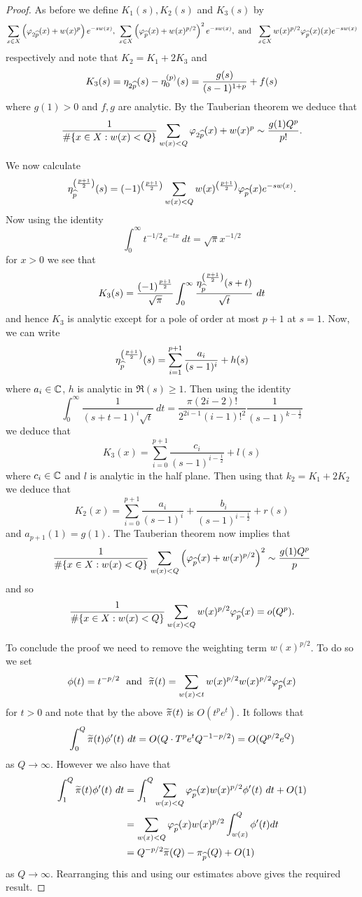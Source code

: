 \documentclass[12pt,a4paper,reqno]{amsart}
\begin{document}
\begin{proof}
As before we define $K_1(s), K_2(s)$ and $K_3(s)$ by 
\begin{align*}
 \sum_{x \in X} \left(\varphi_{2\widehat{p}}(x) + w(x)^p\right) e^{-sw(x)}, \
 \sum_{x \in X} \left(\varphi_{\widehat{p}}(x)+ w(x)^{p/2}\right)^2 e^{-sw(x)}, \text{ and } \
 \sum_{x \in X} w(x)^{p/2} \varphi_{\widehat{p}}(x)(x) e^{-sw(x)}
\end{align*}
respectively
and note that $K_2 = K_1 + 2K_3$ and 
\[
K_3(s) = \eta_{2\widehat{p}}(s) - \eta_0^{(p)}(s) = \frac{g(s)}{(s-1)^{1+p}} + f(s)
\]
where $g(1) > 0$ and $f,g$ are analytic.
By the Tauberian theorem we deduce that
\[
\frac{1}{\#\{x\in X: w(x) < Q\}} \sum_{w(x)<Q} \varphi_{2\widehat{p}}(x)+ w(x)^p \sim \frac{g(1) Q^p}{p!}.
\]

We now calculate
\[
\eta_{\widehat{p}}^{\left( \frac{p+1}{2}\right)}(s) = (-1)^{\left(\frac{p+1}{2}\right)} \sum_{w(x) < Q} w(x)^{\left( \frac{p+1}{2}\right)} \varphi_{\widehat{p}}(x) e^{-sw(x)}.
\]
Now using the identity
\[
\int_0^\infty t^{-1/2} e^{-tx} \ dt = \sqrt{\pi} x^{-1/2}
\]
for $x > 0$ we see that
\[
K_3(s) = \frac{(-1)^{\frac{p+1}{2}}}{\sqrt{\pi}} \int_0^\infty \frac{\eta_{\w{p}}^{\left( \frac{p+1}{2}\right)}(s+t)}{\sqrt{t}} \ dt
\]
and hence $K_3$ is analytic except for a pole of order at most $p+1$ at $s=1$. Now, we can write
\[
\eta_{\widehat{p}}^{\left( \frac{p+1}{2}\right)}(s) = \sum_{i=1}^{p+1} \frac{a_i}{(s-1)^i} + h(s)
\]
where $a_i \in {\mathbb C}$, $h$ is analytic in $\mathfrak{R}(s) \ge 1$. Then using the identity
\[
\int_0^\infty \frac{1}{(s+t - 1)^i \sqrt{t}} \ dt = \frac{\pi (2i -2)!}{2^{2i-1}(i-1)!^2} \frac{1}{(s-1)^{k - \frac{1}{2}}}
\]
we deduce that
\[
K_3(x) = \sum_{i=0}^{p+1} \frac{c_i}{(s-1)^{i-\frac{1}{2}}} + l(s)
\]
where $c_i \in {\mathbb C}$ and $l$ is analytic in the half plane. Then using that $k_2 = K_1 + 2K_2$ we deduce that
\[
K_2(x) = \sum_{i=0}^{p+1} \frac{a_i}{(s-1)^i} + \frac{b_i}{(s-1)^{i-\frac{1}{2}}} + r(s)
\]
and $a_{p+1}(1) = g(1)$. The Tauberian theorem now implies that
\[
\frac{1}{\#\{x \in X: w(x) < Q\}} \sum_{w(x) < Q} \left( \varphi_{\widehat{p}}(x)+ w(x)^{p/2} \right)^2  \sim \frac{g(1) Q^p}{p}
\]
and so
\[
\frac{1}{\#\{x \in X: w(x) <Q\}} \sum_{w(x) <Q} w(x)^{p/2} \varphi_{\widehat{p}}(x)= o(Q^p).
\]

To conclude the proof we need to remove the weighting term $w(x)^{p/2}$. To do so we set
\[
\phi(t) = t^{-p/2} \ \text{ and } \ \widetilde{\pi}(t) = \sum_{w(x) < t} w(x)^{p/2} w(x)^{p/2} \varphi_{\widehat{p}}(x)
\]
for $t>0$ and note that by the above $\widetilde{\pi}(t)$ is $O(t^pe^t)$. It follows that
\[
\int_0^Q \widetilde{\pi}(t) \phi'(t) \ dt = O( Q \cdot T^p e^t Q^{-1-p/2}) = O(Q^{p/2} e^Q)
\]
as $Q\to\infty$.
However we also have that
\begin{align*}
\int_1^Q \widetilde{\pi}(t) \phi'(t) \ dt &= \int_1^Q\sum_{w(x) < Q} \varphi_{\widehat{p}}(x) w(x)^{p/2} \phi'(t) \ dt + O(1) \\
&= \sum_{w(x) < Q} \varphi_{\widehat{p}}(x) w(x)^{p/2} \int_{w(x)}^Q \phi'(t)  dt\\
 &= Q^{-p/2} \widetilde{\pi}(Q) - \pi_{\widehat{p}}(Q) + O(1)
\end{align*}
as $Q\to\infty$. Rearranging this and using our estimates above gives the required result.
\end{proof}
\end{document}
